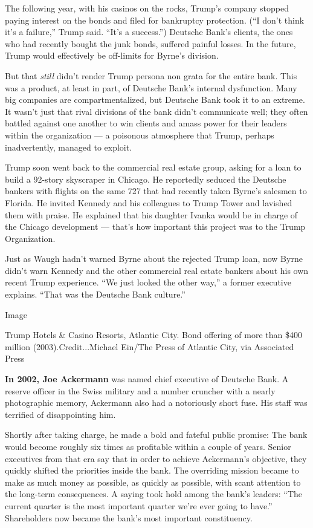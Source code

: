The following year, with his casinos on the rocks, Trump's company
stopped paying interest on the bonds and filed for bankruptcy
protection. (``I don't think it's a failure,'' Trump said. ``It's a
success.'') ­Deutsche Bank's clients, the ones who had recently bought
the junk bonds, suffered painful losses. In the future, Trump would
effectively be off-­limits for Byrne's division.

But that \emph{still} didn't render Trump persona non grata for the
entire bank. This was a product, at least in part, of ­Deutsche Bank's
internal dysfunction. Many big companies are compartmentalized, but
­Deutsche Bank took it to an extreme. It wasn't just that rival
divisions of the bank didn't communicate well; they often battled
against one another to win clients and amass power for their leaders
within the organization --- a poisonous atmosphere that Trump, perhaps
inadvertently, managed to exploit.

Trump soon went back to the commercial real estate group, asking for a
loan to build a 92-­story skyscraper in Chicago. He reportedly seduced
the ­Deutsche bankers with flights on the same 727 that had recently
taken Byrne's salesmen to Florida. He invited Kennedy and his colleagues
to Trump Tower and lavished them with praise. He explained that his
daughter Ivanka would be in charge of the Chicago development --- that's
how important this project was to the Trump Organization.

Just as Waugh hadn't warned Byrne about the rejected Trump loan, now
Byrne didn't warn Kennedy and the other commercial real estate bankers
about his own recent Trump experience. ``We just looked the other way,''
a former executive explains. ``That was the ­Deutsche Bank culture.''

Image

Trump Hotels \& Casino Resorts, Atlantic City. Bond offering of more
than \$400 million (2003).Credit...Michael Ein/The Press of Atlantic
City, via Associated Press

\textbf{In 2002, Joe Ackermann} was named chief executive of ­Deutsche
Bank. A reserve officer in the Swiss military and a number cruncher with
a nearly photographic memory, Ackermann also had a notoriously short
fuse. His staff was terrified of disappointing him.

Shortly after taking charge, he made a bold and fateful public promise:
The bank would become roughly six times as profitable within a couple of
years. Senior executives from that era say that in order to achieve
Ackermann's objective, they quickly shifted the priorities inside the
bank. The overriding mission became to make as much money as possible,
as quickly as possible, with scant attention to the long-term
consequences. A saying took hold among the bank's leaders: ``The current
quarter is the most important quarter we're ever going to have.''
Shareholders now became the bank's most important constituency.


